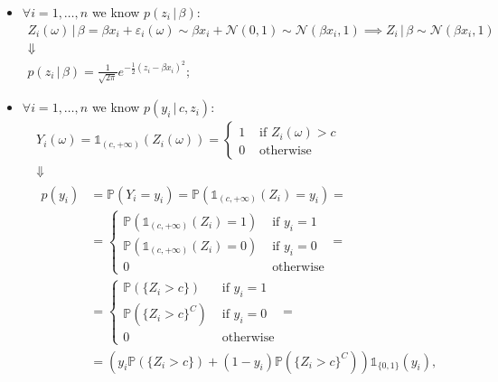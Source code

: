 \documentclass[
  11pt,
]{article}
\providecommand{\tightlist}{%
  \setlength{\itemsep}{0pt}\setlength{\parskip}{0pt}}
\begin{document}
\begin{itemize}
\tightlist
\item
  \(\forall i = 1, \dots, n\) we know \(p(z_i \,|\,\beta)\):
  \begin{gather*}
        Z_i(\omega) \,|\,\beta = \beta x_i + \varepsilon_i(\omega) \sim \beta x_i + \mathcal{N}\left(0,1\right) \sim \mathcal{N}\left(\beta x_i,1\right) \implies Z_i \,|\,\beta \sim \mathcal{N}\left(\beta x_i,1\right) \\
        \Downarrow \\
        p(z_i \,|\,\beta) = \frac{1}{\sqrt{2\pi}} e^{-\frac{1}{2} (z_i - \beta x_i)^2};
    \end{gather*}
\item
  \(\forall i = 1, \dots, n\) we know \(p(y_i \,|\,c, z_i)\):
  \begin{gather*}
        Y_i(\omega) = \mathds{1}_{(c, +\infty)}(Z_i(\omega)) = 
        \begin{cases}
            1 & \text{ if } Z_i(\omega) > c \\
            0 & \text{ otherwise}
        \end{cases} \\
        \Downarrow \\
        \begin{aligned}
            p(y_i) & = \mathbb{P}\left(Y_i = y_i\right) = \mathbb{P}\left(\mathds{1}_{(c, +\infty)}(Z_i) = y_i\right) = \\
            & = \begin{cases}
                    \mathbb{P}\left(\mathds{1}_{(c, +\infty)}(Z_i) = 1\right) & \text{ if } y_i = 1 \\
                    \mathbb{P}\left(\mathds{1}_{(c, +\infty)}(Z_i) = 0\right) & \text{ if } y_i = 0 \\
                    0 & \text{ otherwise}
                \end{cases} = \\
            & = \begin{cases}
                    \mathbb{P}\left(\{Z_i > c\}\right) & \text{ if } y_i = 1 \\
                    \mathbb{P}\left(\{Z_i > c\}^C\right) & \text{ if } y_i = 0 \\
                    0 & \text{ otherwise}
                \end{cases} = \\
            & = \left(y_i \mathbb{P}\left(\{Z_i > c\}\right) + (1 - y_i) \mathbb{P}\left(\{Z_i > c\}^C\right)\right) \mathds{1}_{\{0, 1\}}(y_i),

\end{aligned}
\end{gather*}
\end{itemize}
\end{document}
